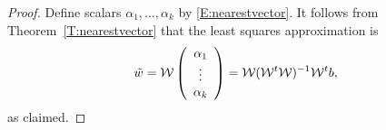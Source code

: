 \documentclass{ximera}
\begin{document}
\begin{proof}
Define scalars $\alpha_1,\ldots,\alpha_k$ by \eqref{E:nearestvector}.  It follows 
from Theorem~\ref{T:nearestvector} that the least squares approximation is
\[ 
\tilde{w} = \mathcal{W} \left(\begin{array}{c} \alpha_1 \\ \vdots \\ \alpha_k \end{array}\right) 
= \mathcal{W} (\mathcal{W}^t \mathcal{W} )^{-1} \mathcal{W}^t b, 
\]
as claimed.
\end{proof}

\end{document}
